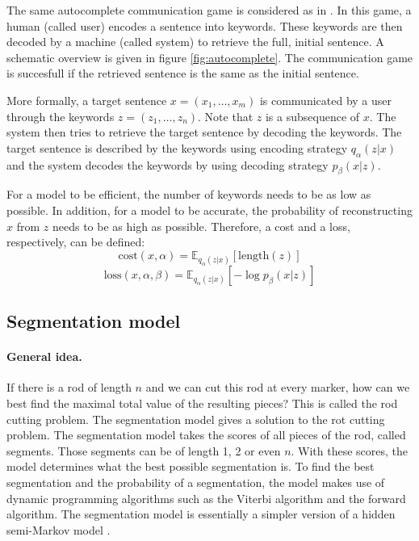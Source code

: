 The same autocomplete communication game is considered as in . In this game, a human (called user) encodes a sentence into keywords. 
These keywords are then decoded by a machine (called system) to retrieve the full, initial sentence. 
A schematic overview is given in figure \ref{fig:autocomplete}. 
The communication game is succesfull if the retrieved sentence is the same as the initial sentence. 

More formally, a target sentence $x=(x_1, \dots, x_m)$ is communicated by a user through the keywords $z=(z_1, \dots, z_n)$. 
Note that $z$ is a subsequence of $x$. 
The system then tries to retrieve the target sentence by decoding the keywords. 
The target sentence is described by the keywords using encoding strategy $q_{\alpha}(z | x)$ and the system decodes the keywords by using decoding strategy $p_{\beta}(x|z)$. 

For a model to be efficient, the number of keywords needs to be as low as possible. 
In addition, for a model to be accurate, the probability of reconstructing $x$ from $z$ needs to be as high as possible. 
Therefore, a cost and a loss, respectively, can be defined:
\begin{equation}
    \label{eq:cost}
    \text{cost}(x,\alpha) = \mathbb{E}_{q_{\alpha}(z|x)} [\text{length}(z)]
\end{equation}
\begin{equation}
    \label{eq:loss}
    \text{loss}(x,\alpha,\beta) = \mathbb{E}_{q_{\alpha}(z|x)} [-\log p_{\beta}(x|z)]
\end{equation}

\subsection{Segmentation model}
\label{sec:segmentation}

\paragraph{General idea.}
If there is a rod of length $n$ and we can cut this rod at every marker, how can we best find the maximal total value of the resulting pieces?
This is called the rod cutting problem.
The segmentation model gives a solution to the rot cutting problem. 
The segmentation model takes the scores of all pieces of the rod, called segments. 
Those segments can be of length 1, 2 or even $n$. 
With these scores, the model determines what the best possible segmentation is. 
To find the best segmentation and the probability of a segmentation, the model makes use of dynamic programming algorithms such as the Viterbi algorithm  and the forward algorithm.
The segmentation model is essentially a simpler version of a hidden semi-Markov model . 

